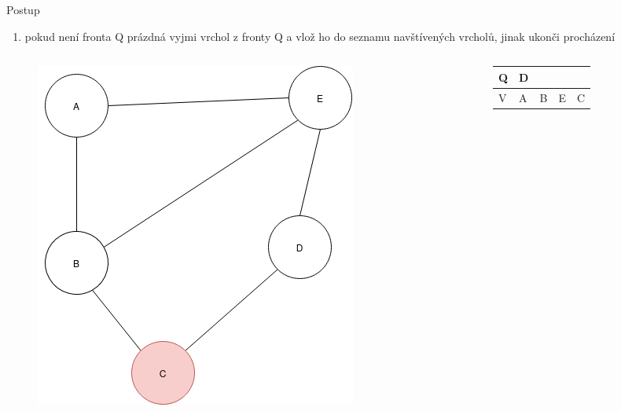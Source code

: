 \documentclass[hyperref={unicode}]{beamer}
\begin{document}
\begin{frame}
\begin{block}{Postup}
\begin{enumerate}
  [default]
    \item pokud není fronta Q prázdná vyjmi vrchol z fronty Q a vlož ho do seznamu navštívených vrcholů, jinak ukonči procházení
\end{enumerate}
\end{block}
  \begin{columns}[T]
    \begin{column}{0.3\linewidth}
        \begin{figure}
        \includegraphics[width=\linewidth]{state7.png}
        \end{figure}
    \end{column}
    \begin{column}{0.3\linewidth}
    \begin{table}[]
        \begin{tabular}{|l||l|l|l|l|}
        \hline
        Q & D &   &   &   \\ \hline
        V & A & B & E & C \\ \hline
        \end{tabular}
\end{table}
    \end{column}
  \end{columns}
\end{frame}
\end{document}

